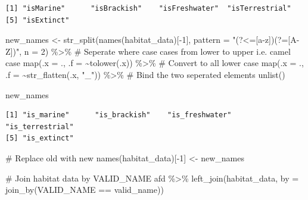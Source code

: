 \documentclass[
  letterpaper,
  DIV=11,
  numbers=noendperiod,
  oneside]{scrreprt}
\newenvironment{Shaded}{\begin{snugshade}}{\end{snugshade}}
\newcommand{\AttributeTok}[1]{\textcolor[rgb]{0.40,0.45,0.13}{#1}}
\newcommand{\CommentTok}[1]{\textcolor[rgb]{0.37,0.37,0.37}{#1}}
\newcommand{\DecValTok}[1]{\textcolor[rgb]{0.68,0.00,0.00}{#1}}
\newcommand{\FunctionTok}[1]{\textcolor[rgb]{0.28,0.35,0.67}{#1}}
\newcommand{\NormalTok}[1]{\textcolor[rgb]{0.00,0.23,0.31}{#1}}
\newcommand{\OtherTok}[1]{\textcolor[rgb]{0.00,0.23,0.31}{#1}}
\newcommand{\SpecialCharTok}[1]{\textcolor[rgb]{0.37,0.37,0.37}{#1}}
\newcommand{\StringTok}[1]{\textcolor[rgb]{0.13,0.47,0.30}{#1}}
\begin{document}
\begin{verbatim}
[1] "isMarine"      "isBrackish"    "isFreshwater"  "isTerrestrial"
[5] "isExtinct"    
\end{verbatim}

\begin{Shaded}
\begin{Highlighting}[]
\NormalTok{new\_names }\OtherTok{\textless{}{-}} \FunctionTok{str\_split}\NormalTok{(}\FunctionTok{names}\NormalTok{(habitat\_data)[}\SpecialCharTok{{-}}\DecValTok{1}\NormalTok{], }\AttributeTok{pattern =}  \StringTok{"(?\textless{}=[a{-}z])(?=[A{-}Z])"}\NormalTok{, }\AttributeTok{n =} \DecValTok{2}\NormalTok{) }\SpecialCharTok{\%\textgreater{}\%}  \CommentTok{\# Seperate where case cases from lower to upper i.e. camel case}
  \FunctionTok{map}\NormalTok{(}\AttributeTok{.x =}\NormalTok{ ., }
      \AttributeTok{.f =} \SpecialCharTok{\textasciitilde{}}\FunctionTok{tolower}\NormalTok{(.x)) }\SpecialCharTok{\%\textgreater{}\%} \CommentTok{\# Convert to all lower case}
    \FunctionTok{map}\NormalTok{(}\AttributeTok{.x =}\NormalTok{ ., }
      \AttributeTok{.f =} \SpecialCharTok{\textasciitilde{}}\FunctionTok{str\_flatten}\NormalTok{(.x, }\StringTok{"\_"}\NormalTok{)) }\SpecialCharTok{\%\textgreater{}\%}  \CommentTok{\# Bind the two seperated elements}
  \FunctionTok{unlist}\NormalTok{()}
  
\NormalTok{new\_names}
\end{Highlighting}
\end{Shaded}

\begin{verbatim}
[1] "is_marine"      "is_brackish"    "is_freshwater"  "is_terrestrial"
[5] "is_extinct"    
\end{verbatim}

\begin{Shaded}
\begin{Highlighting}[]
\CommentTok{\# Replace old with new}
\FunctionTok{names}\NormalTok{(habitat\_data)[}\SpecialCharTok{{-}}\DecValTok{1}\NormalTok{] }\OtherTok{\textless{}{-}}\NormalTok{ new\_names}

\CommentTok{\# Join habitat data by VALID\_NAME}
\NormalTok{afd }\SpecialCharTok{\%\textgreater{}\%} \FunctionTok{left\_join}\NormalTok{(habitat\_data, }\AttributeTok{by =} \FunctionTok{join\_by}\NormalTok{(VALID\_NAME }\SpecialCharTok{==}\NormalTok{ valid\_name))}
\end{Highlighting}
\end{Shaded}
\end{document}

